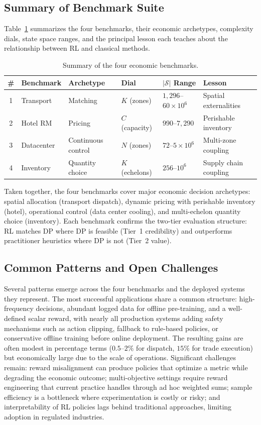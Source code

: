 \subsection{Summary of Benchmark Suite}
\label{sec:benchmark_summary}

Table~\ref{tab:benchmark_summary} summarizes the four benchmarks, their economic archetypes, complexity dials, state space ranges, and the principal lesson each teaches about the relationship between RL and classical methods.

\begin{table}[htbp]
\centering
\caption{Summary of the four economic benchmarks.}
\label{tab:benchmark_summary}
\begin{tabular}{clllll}
\toprule
\# & Benchmark & Archetype & Dial & $|\mathcal{S}|$ Range & Lesson \\
\midrule
1 & Transport & Matching & $K$ (zones) & $1{,}296$--$60 \times 10^6$ & Spatial externalities \\
2 & Hotel RM & Pricing & $C$ (capacity) & $990$--$7{,}290$ & Perishable inventory \\
3 & Datacenter & Continuous control & $N$ (zones) & $72$--$5 \times 10^6$ & Multi-zone coupling \\
4 & Inventory & Quantity choice & $K$ (echelons) & $256$--$10^6$ & Supply chain coupling \\
\bottomrule
\end{tabular}
\end{table}

Taken together, the four benchmarks cover major economic decision archetypes: spatial allocation (transport dispatch), dynamic pricing with perishable inventory (hotel), operational control (data center cooling), and multi-echelon quantity choice (inventory). Each benchmark confirms the two-tier evaluation structure: RL matches DP where DP is feasible (Tier~1 credibility) and outperforms practitioner heuristics where DP is not (Tier~2 value).

\subsection{Common Patterns and Open Challenges}
\label{sec:benchmark_patterns}

Several patterns emerge across the four benchmarks and the deployed systems they represent. The most successful applications share a common structure: high-frequency decisions, abundant logged data for offline pre-training, and a well-defined scalar reward, with nearly all production systems adding safety mechanisms such as action clipping, fallback to rule-based policies, or conservative offline training before online deployment. The resulting gains are often modest in percentage terms ($0.5$--$2\%$ for dispatch, $15\%$ for trade execution) but economically large due to the scale of operations. Significant challenges remain: reward misalignment can produce policies that optimize a metric while degrading the economic outcome; multi-objective settings require reward engineering that current practice handles through ad hoc weighted sums; sample efficiency is a bottleneck where experimentation is costly or risky; and interpretability of RL policies lags behind traditional approaches, limiting adoption in regulated industries.

